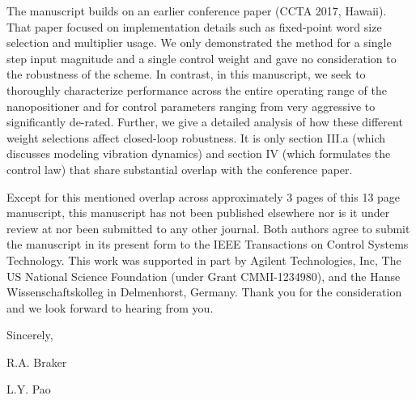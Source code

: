 \documentclass[a4paper,twoside]{article}
\begin{document}
The manuscript builds on an earlier conference paper (CCTA 2017, Hawaii). That paper focused on implementation details such as fixed-point word size selection and multiplier usage. We only demonstrated the method for a single step input magnitude and a single control weight and gave no consideration to the robustness of the scheme. In contrast, in this manuscript, we seek to thoroughly characterize performance across the entire operating range of the nanopositioner and for control parameters ranging from very aggressive to significantly de-rated. Further, we give a detailed analysis of how these different weight selections affect closed-loop robustness. It is only section III.a (which discusses modeling vibration dynamics) and section IV (which formulates the control law) that share substantial overlap with the conference paper.

Except for this mentioned overlap across approximately 3 pages of this 13 page manuscript, this manuscript has not been published elsewhere nor is it under review at nor been submitted to any other journal. Both authors agree to submit the manuscript in its present form to the IEEE Transactions on Control Systems Technology. This work was supported in part by Agilent Technologies, Inc, The US National Science Foundation (under Grant CMMI-1234980), and the Hanse Wissenschaftskolleg in Delmenhorst, Germany. Thank you for the consideration and we look forward to hearing from you.

\par\bigskip
\noindent Sincerely,
\par\bigskip
\noindent R.A. Braker\par
\noindent L.Y. Pao
\end{document}
